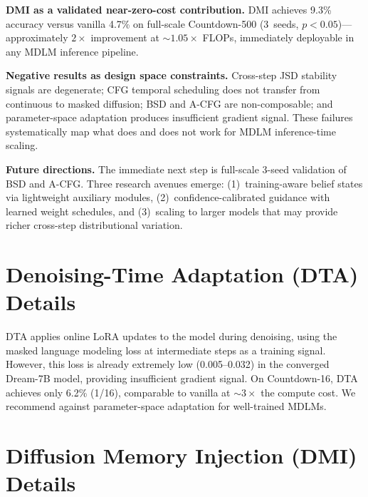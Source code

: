 \documentclass{article}
\begin{document}
\textbf{DMI as a validated near-zero-cost contribution.} DMI achieves 9.3\% accuracy versus vanilla 4.7\% on full-scale Countdown-500 (3~seeds, $p < 0.05$)---approximately $2{\times}$ improvement at ${\sim}1.05{\times}$ FLOPs, immediately deployable in any MDLM inference pipeline.

\textbf{Negative results as design space constraints.} Cross-step JSD stability signals are degenerate; CFG temporal scheduling does not transfer from continuous to masked diffusion; BSD and A-CFG are non-composable; and parameter-space adaptation produces insufficient gradient signal. These failures systematically map what does and does not work for MDLM inference-time scaling.

\textbf{Future directions.} The immediate next step is full-scale 3-seed validation of BSD and A-CFG. Three research avenues emerge: (1)~training-aware belief states via lightweight auxiliary modules, (2)~confidence-calibrated guidance with learned weight schedules, and (3)~scaling to larger models that may provide richer cross-step distributional variation.






\appendix

\section{Denoising-Time Adaptation (DTA) Details}
\label{app:dta}

DTA applies online LoRA updates to the model during denoising, using the masked language modeling loss at intermediate steps as a training signal. However, this loss is already extremely low (0.005--0.032) in the converged Dream-7B model, providing insufficient gradient signal. On Countdown-16, DTA achieves only 6.2\% (1/16), comparable to vanilla at ${\sim}3{\times}$ the compute cost. We recommend against parameter-space adaptation for well-trained MDLMs.

\section{Diffusion Memory Injection (DMI) Details}
\label{app:dmi}
\end{document}
